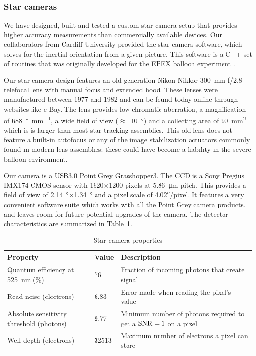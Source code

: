 \subsubsection{Star cameras}

We have designed, built and tested a custom star camera setup that provides higher accuracy measurements than commercially available devices. Our collaborators from Cardiff University provided the star camera software, which solves for the inertial orientation from a given picture. This software is a C++ set of routines that was originally developed for the EBEX balloon experiment \citep{Oxley:2004hl}. 

Our star camera design features an old-generation Nikon Nikkor \SI{300}{\mm} f/2.8 telefocal lens with manual focus and extended hood. These lenses were manufactured between 1977 and 1982 and can be found today online through websites like e-Bay. The lens provides low chromatic aberration, a magnification of \SI{688}{\arcsecond\per\mm}, a wide field of view ($\approx$~\SI{10}{\degree}) and a collecting area of \SI{90}{\mm\squared} which is is larger than most star tracking assemblies. This old lens does not feature a built-in autofocus or any of the image stabilization actuators commonly found in modern lens assemblies: these could have become a liability in the severe balloon environment. 

Our camera is a USB3.0 Point Grey Grasshopper3. The CCD is a Sony Pregius IMX174 CMOS sensor with 1920$\times$1200 pixels at \SI{5.86}{\um} pitch. This provides a field of view of \SI{2.14}{\degree}$\times$\SI{1.34}{\degree} and a pixel scale of \ang{;;4.02}/pixel. It features a very convenient software suite which works with all the Point Grey camera products, and leaves room for future potential upgrades of the camera. The detector characteristics are summarized in Table~\ref{tab:starcamproperties}.

\renewcommand{\arraystretch}{1.5}
\begin{table}[htbp]
\label{tab:starcamproperties}
\small
\begin{tabular}{p{4cm}|p{1cm}|p{8.5cm}}
\toprule
Property & Value & Description \\
\midrule
Quantum efficiency at \SI{525}{\nm} (\%) & 76 & Fraction of incoming photons that create signal \\

Read noise (electrons) & 6.83 & Error made when reading the pixel's value \\

Absolute sensitivity threshold (photons) & 9.77 & Minimum number of photons required to get a $\textrm{SNR}=1$ on a pixel\\

Well depth (electrons) & \num{32513} & Maximum number of electrons a pixel can store\\
\bottomrule
\end{tabular}
\caption[Star camera properties]{Star camera properties}
\end{table}



